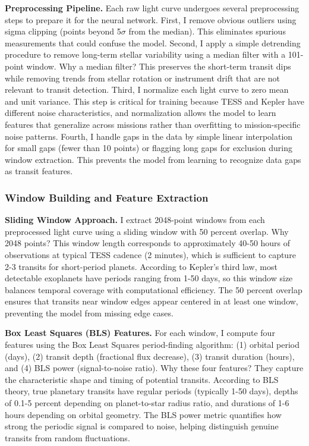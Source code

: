 \documentclass[letterpaper]{article} %
\begin{document}
\textbf{Preprocessing Pipeline.} Each raw light curve undergoes several preprocessing steps to prepare it for the neural network. First, I remove obvious outliers using sigma clipping (points beyond 5$\sigma$ from the median). This eliminates spurious measurements that could confuse the model. Second, I apply a simple detrending procedure to remove long-term stellar variability using a median filter with a 101-point window. Why a median filter? This preserves the short-term transit dips while removing trends from stellar rotation or instrument drift that are not relevant to transit detection. Third, I normalize each light curve to zero mean and unit variance. This step is critical for training because TESS and Kepler have different noise characteristics, and normalization allows the model to learn features that generalize across missions rather than overfitting to mission-specific noise patterns. Fourth, I handle gaps in the data by simple linear interpolation for small gaps (fewer than 10 points) or flagging long gaps for exclusion during window extraction. This prevents the model from learning to recognize data gaps as transit features.

\subsubsection{Window Building and Feature Extraction}
\textbf{Sliding Window Approach.} I extract 2048-point windows from each preprocessed light curve using a sliding window with 50 percent overlap. Why 2048 points? This window length corresponds to approximately 40-50 hours of observations at typical TESS cadence (2 minutes), which is sufficient to capture 2-3 transits for short-period planets. According to Kepler's third law, most detectable exoplanets have periods ranging from 1-50 days, so this window size balances temporal coverage with computational efficiency. The 50 percent overlap ensures that transits near window edges appear centered in at least one window, preventing the model from missing edge cases.

\textbf{Box Least Squares (BLS) Features.} For each window, I compute four features using the Box Least Squares period-finding algorithm: (1) orbital period (days), (2) transit depth (fractional flux decrease), (3) transit duration (hours), and (4) BLS power (signal-to-noise ratio). Why these four features? They capture the characteristic shape and timing of potential transits. According to BLS theory, true planetary transits have regular periods (typically 1-50 days), depths of 0.1-5 percent depending on planet-to-star radius ratio, and durations of 1-6 hours depending on orbital geometry. The BLS power metric quantifies how strong the periodic signal is compared to noise, helping distinguish genuine transits from random fluctuations.
\end{document}

